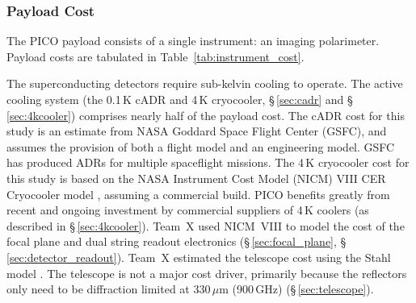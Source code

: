 \subsubsection{Payload Cost}
\label{sec:instrument_cost} %



The PICO payload consists of a single instrument: an imaging
polarimeter. Payload costs are tabulated in
Table~\ref{tab:instrument_cost}.

%

The superconducting detectors require sub-kelvin cooling to
operate. The active cooling system (the 0.1\,K cADR and 4\,K
cryocooler, \S\,\ref{sec:cadr} and \S\,\ref{sec:4kcooler}) comprises nearly half of the payload
cost. The cADR cost for this study is an estimate from NASA Goddard
Space Flight Center (GSFC), and assumes the provision of both a flight
model and an engineering model. GSFC has produced ADRs for multiple
spaceflight missions. The 4\,K cryocooler cost for this study is based
on the NASA Instrument Cost Model (NICM) VIII CER Cryocooler model
\cite{Mrozinski2017}, assuming a commercial build. PICO benefits
greatly from recent and ongoing investment by commercial suppliers of
4\,K coolers (as described in \S\,\ref{sec:4kcooler}).  Team~X used NICM~VIII to model
the cost of the focal plane and dual string readout electronics (\S\,\ref{sec:focal_plane},
\S\,\ref{sec:detector_readout}).  Team~X estimated the telescope cost using the Stahl model
\cite{Stahl2016}. The telescope is not a major cost driver, primarily
because the reflectors only need to be diffraction limited at 330\,$\mu$m
(900\,GHz) (\S\,\ref{sec:telescope}).

